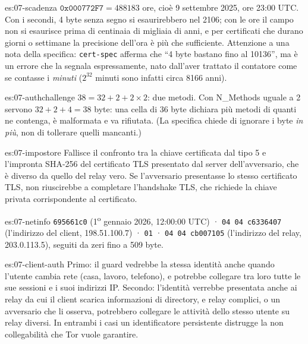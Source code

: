 \begin{soluzione}{es:07-scadenza}
$\texttt{0x000772F7} = 488183$ ore, cioè 9 settembre 2025, ore 23:00 UTC. Con i secondi, 4 byte senza segno si esaurirebbero nel 2106; con le ore il campo non si esaurisce prima di centinaia di migliaia di anni, e per certificati che durano giorni o settimane la precisione dell'ora è più che sufficiente. Attenzione a una nota della specifica: \texttt{cert-spec} afferma che \enquote{4 byte bastano fino al 10136}, ma è un errore che la  segnala espressamente, nato dall'aver trattato il contatore come se contasse i \emph{minuti} ($2^{32}$ minuti sono infatti circa 8166 anni).
\end{soluzione}

\begin{soluzione}{es:07-authchallenge}
$38 = 32 + 2 + 2 \times 2$: due metodi. Con N\_Methods uguale a 2 servono $32 + 2 + 4 = 38$ byte: una cella di 36 byte dichiara più metodi di quanti ne contenga, è malformata e va rifiutata. (La specifica chiede di ignorare i byte \emph{in più}, non di tollerare quelli mancanti.)
\end{soluzione}

\begin{soluzione}{es:07-impostore}
Fallisce il confronto tra la chiave certificata dal tipo 5 e l'impronta SHA-256 del certificato TLS presentato dal server dell'avversario, che è diverso da quello del relay vero. Se l'avversario presentasse lo stesso certificato TLS, non riuscirebbe a completare l'handshake TLS, che richiede la chiave privata corrispondente al certificato.
\end{soluzione}

\begin{soluzione}{es:07-netinfo}
\texttt{695661c0} (1\textsuperscript{o} gennaio 2026, 12:00:00 UTC) · \texttt{04 04 c6336407} (l'indirizzo del client, 198.51.100.7) · \texttt{01} · \texttt{04 04 cb007105} (l'indirizzo del relay, 203.0.113.5), seguiti da zeri fino a 509 byte.
\end{soluzione}

\begin{soluzione}{es:07-client-auth}
Primo: il guard vedrebbe la stessa identità anche quando l'utente cambia rete (casa, lavoro, telefono), e potrebbe collegare tra loro tutte le sue sessioni e i suoi indirizzi IP. Secondo: l'identità verrebbe presentata anche ai relay da cui il client scarica informazioni di directory, e relay complici, o un avversario che li osserva, potrebbero collegare le attività dello stesso utente su relay diversi. In entrambi i casi un identificatore persistente distrugge la non collegabilità che Tor vuole garantire.
\end{soluzione}

